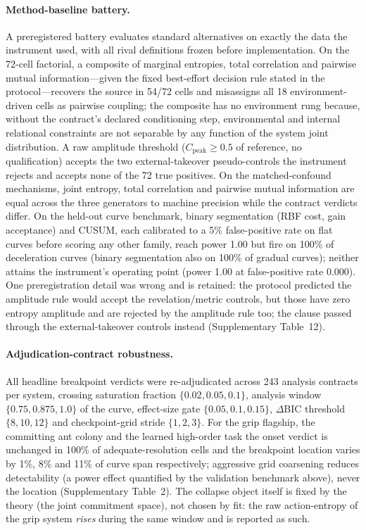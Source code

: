\documentclass[11pt]{article}
\begin{document}
\paragraph{Method-baseline battery.}
A preregistered battery evaluates standard alternatives on exactly the
data the instrument used, with all rival definitions frozen before
implementation. On the 72-cell factorial, a composite of marginal
entropies, total correlation and pairwise mutual information---given
the fixed best-effort decision rule stated in the protocol---recovers
the source in 54/72 cells and misassigns all 18 environment-driven
cells as pairwise coupling; the composite has no environment rung
because, without the contract's declared conditioning step,
environmental and internal relational constraints are not separable by
any function of the system joint distribution. A raw
amplitude threshold ($C_\mathrm{peak}\geq 0.5$ of reference, no
qualification) accepts the two external-takeover pseudo-controls the
instrument rejects and accepts none of the 72 true positives. On the
matched-confound mechanisms, joint entropy, total correlation and
pairwise mutual information are equal across the three generators to
machine precision while the contract verdicts differ. On the held-out
curve benchmark, binary segmentation (RBF cost, gain acceptance) and
CUSUM, each calibrated to a 5\% false-positive rate on flat curves
before scoring any other family, reach power 1.00 but fire on 100\% of
deceleration curves (binary segmentation also on 100\% of gradual
curves); neither attains the instrument's operating point (power 1.00
at false-positive rate 0.000). One preregistration detail was wrong
and is retained: the protocol predicted the amplitude rule would
accept the revelation/metric controls, but those have zero entropy
amplitude and are rejected by the amplitude rule too; the clause
passed through the external-takeover controls instead (Supplementary
Table~12).

\paragraph{Adjudication-contract robustness.}
All headline breakpoint verdicts were re-adjudicated across 243 analysis
contracts per system, crossing saturation fraction
$\{0.02,0.05,0.1\}$, analysis window $\{0.75,0.875,1.0\}$ of the curve,
effect-size gate $\{0.05,0.1,0.15\}$, $\Delta$BIC threshold
$\{8,10,12\}$ and checkpoint-grid stride $\{1,2,3\}$. For the grip
flagship, the committing ant colony and the learned high-order task the
onset verdict is unchanged in 100\% of adequate-resolution cells and the
breakpoint location varies by 1\%, 8\% and 11\% of curve span
respectively; aggressive grid coarsening reduces detectability (a power
effect quantified by the validation benchmark above), never the
location (Supplementary Table~2). The collapse object itself is fixed by the theory (the joint
commitment space), not chosen by fit: the raw action-entropy of the grip
system \emph{rises} during the same window and is reported as such.
\end{document}
